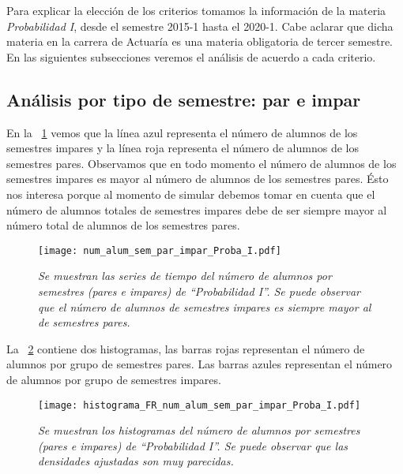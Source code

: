 Para explicar la elección de los criterios tomamos la información de la materia \textit{Probabilidad I}, desde el semestre 2015-1 hasta el 2020-1. Cabe aclarar que dicha materia en la carrera de Actuaría es una materia obligatoria de tercer semestre. En las siguientes subsecciones veremos el análisis de acuerdo a cada criterio.

\subsection{Análisis por tipo de semestre: par e impar}

En la \figurename{~\ref{ParImparProbaI}} vemos que la línea azul representa el número de alumnos de los semestres impares y la línea roja representa el número de alumnos de los semestres pares. Observamos que en todo momento el número de alumnos de los semestres impares es mayor al número de alumnos de los semestres pares. Ésto nos interesa porque al momento de simular debemos tomar en cuenta que el número de alumnos totales de semestres impares debe de ser siempre mayor al número total de alumnos de los semestres pares.

\begin{figure}[H]
\centering
\texttt{[image: num\_alum\_sem\_par\_impar\_Proba\_I.pdf]} %
\caption[\textit{Número de alumnos por semestres pares e impares: Probabilidad I}]{\textit{Se muestran las series de tiempo del número de alumnos por semestres (pares e impares) de ``Probabilidad I''. Se puede observar que el número de alumnos de semestres impares es siempre mayor al de semestres pares.}}\label{ParImparProbaI}
\end{figure}

La \figurename{~\ref{HistAlumParImparProbaI}} contiene dos histogramas, las barras rojas representan el número de alumnos por grupo de semestres pares. Las barras azules representan el número de alumnos por grupo de semestres impares.

\begin{figure}[h]
\centering
\texttt{[image: histograma\_FR\_num\_alum\_sem\_par\_impar\_Proba\_I.pdf]} %
\caption[\textit{Histogramas del número de alumnos por semestre: Probabilidad I}]{\textit{Se muestran los histogramas del número de alumnos por semestres (pares e impares) de ``Probabilidad I''. Se puede observar que las densidades ajustadas son muy parecidas.}}\label{HistAlumParImparProbaI}
\end{figure}

